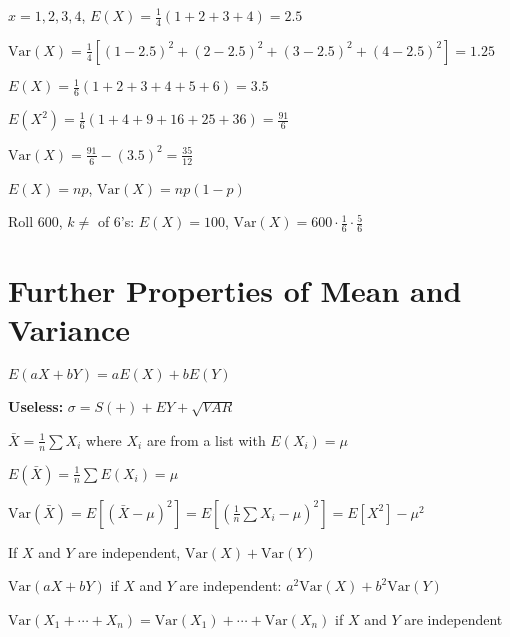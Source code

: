 \begin{example}
$x = 1, 2, 3, 4$, $E(X) = \frac{1}{4}(1 + 2 + 3 + 4) = 2.5$

$\text{Var}(X) = \frac{1}{4}[(1 - 2.5)^2 + (2 - 2.5)^2 + (3 - 2.5)^2 + (4 - 2.5)^2] = 1.25$
\end{example}

\begin{example}
$E(X) = \frac{1}{6}(1 + 2 + 3 + 4 + 5 + 6) = 3.5$

$E(X^2) = \frac{1}{6}(1 + 4 + 9 + 16 + 25 + 36) = \frac{91}{6}$

$\text{Var}(X) = \frac{91}{6} - (3.5)^2 = \frac{35}{12}$
\end{example}

\begin{example}[Binomial]
$E(X) = np$, $\text{Var}(X) = np(1 - p)$

Roll 600, $k \neq$ of 6's: $E(X) = 100$, $\text{Var}(X) = 600 \cdot \frac{1}{6} \cdot \frac{5}{6}$
\end{example}

\section{Further Properties of Mean and Variance}

\begin{theorem}[Lemma]
$E(aX + bY) = aE(X) + bE(Y)$
\end{theorem}

\textbf{Useless:} $\sigma = S(+)+EY + \sqrt{VAR}$

\begin{definition}
$\bar{X} = \frac{1}{n} \sum X_i$ where $X_i$ are from a list with $E(X_i) = \mu$

$E(\bar{X}) = \frac{1}{n} \sum E(X_i) = \mu$
\end{definition}

\begin{note}
$\text{Var}(\bar{X}) = E[(\bar{X} - \mu)^2] = E\left[\left(\frac{1}{n} \sum X_i - \mu\right)^2\right] = E\left[X^2\right] - \mu^2$
\end{note}

\begin{note}
If $X$ and $Y$ are independent, $\text{Var}(X) + \text{Var}(Y)$
\end{note}

$\text{Var}(aX + bY)$ if $X$ and $Y$ are independent: $a^2 \text{Var}(X) + b^2 \text{Var}(Y)$

$\text{Var}(X_1 + \cdots + X_n) = \text{Var}(X_1) + \cdots + \text{Var}(X_n)$ if $X$ and $Y$ are independent

